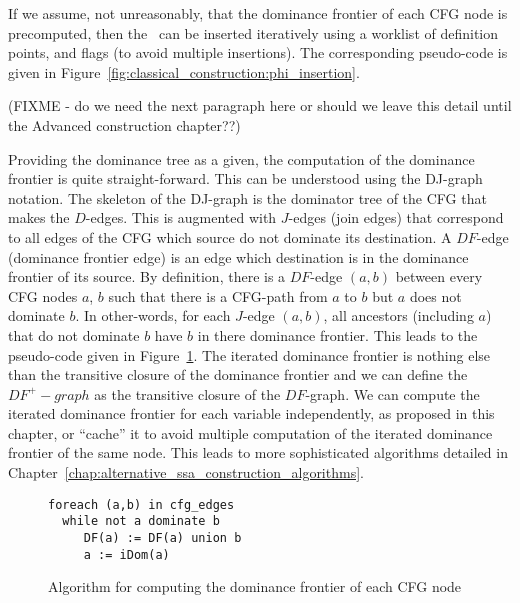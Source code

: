 If we assume, not unreasonably, that the dominance frontier of each CFG node is precomputed, then the \phiops\ can be inserted iteratively using a worklist of definition points, and flags (to avoid multiple insertions). The corresponding pseudo-code is given in Figure~\ref{fig:classical_construction:phi_insertion}.

(FIXME - do we need the next paragraph here or should we leave this detail until
the Advanced construction chapter??)

Providing the dominance tree as a given, the computation of the dominance frontier is quite straight-forward. This can be understood using the DJ-graph notation. The skeleton of the DJ-graph is the dominator tree of the CFG that makes the $D$-edges. This is augmented with $J$-edges (join edges) that correspond to all edges of the CFG which source do not dominate its destination. A $DF$-edge (dominance frontier edge) is an edge which destination is in the dominance frontier of its source. By definition, there is a $DF$-edge $(a,b)$ between every CFG nodes $a$, $b$ such that there is a CFG-path from $a$ to $b$ but $a$ does not dominate $b$. 
In other-words, for each  $J$-edge $(a,b)$, all ancestors (including $a$) that do not dominate $b$ have $b$ in there dominance frontier. This leads to the pseudo-code given in Figure~\ref{fig:classical_construction:df}. The iterated dominance frontier is nothing else than the transitive closure of the dominance frontier and we can define the $DF^+-graph$ as the transitive closure of the $DF$-graph. We can compute the iterated dominance frontier for each variable independently, as proposed in this chapter, or ``cache'' it to avoid multiple computation of the iterated dominance frontier of the same node. This leads to more sophisticated algorithms detailed in Chapter~\ref{chap:alternative_ssa_construction_algorithms}.

\begin{figure}
\begin{verbatim}
foreach (a,b) in cfg_edges
  while not a dominate b
     DF(a) := DF(a) union b
     a := iDom(a)
\end{verbatim}
\caption{\label{fig:classical_construction:df}Algorithm for computing the dominance frontier of each CFG node}
\end{figure}

